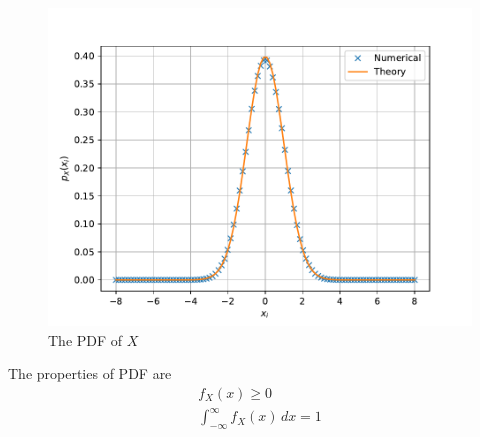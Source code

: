 \documentclass[journal,8pt,onecolumn]{IEEEtran}
\begin{document}
\begin{enumerate}
\begin{figure}[H]
\centering
\includegraphics[width=\columnwidth/2]{./figs/gau_pdf.pdf}
\caption{The PDF of $X$}
\label{fig:gauss_pdf}
\end{figure}

The properties of PDF are
\begin{eqnarray}
	f_X(x) \ge 0\\
	\int_{-\infty}^{\infty} f_X(x) \,dx = 1
\end{eqnarray}


\end{enumerate}
\end{document}
